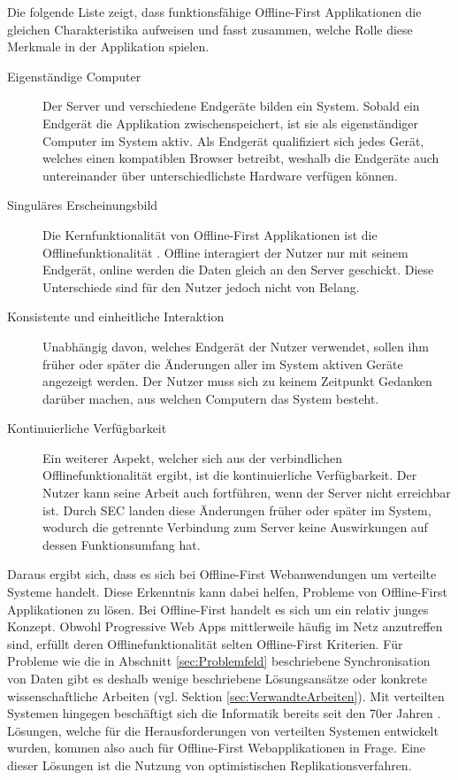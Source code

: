 \documentclass[a4paper, 12pt]{scrreprt}
\begin{document}
Die folgende Liste zeigt, dass funktionsfähige Offline-First Applikationen die gleichen Charakteristika aufweisen und fasst zusammen, welche Rolle diese Merkmale in der Applikation spielen.

\begin{description}		
\item[Eigenständige Computer] Der Server und verschiedene Endgeräte bilden ein System. Sobald ein Endgerät die Applikation zwischenspeichert, ist sie als eigenständiger Computer im System aktiv. Als Endgerät qualifiziert sich jedes Gerät, welches einen kompatiblen Browser betreibt, weshalb die Endgeräte auch untereinander über unterschiedlichste Hardware verfügen können.
\item[Singuläres Erscheinungsbild]Die Kernfunktionalität von Offline-First Applikationen ist die Offlinefunktionalität \autocite{OnlineGoogleOfflineFirst}. Offline interagiert der Nutzer nur mit seinem Endgerät, online werden die Daten gleich an den Server geschickt. Diese Unterschiede sind für den Nutzer jedoch nicht von Belang. \item[Konsistente und einheitliche Interaktion]
Unabhängig davon, welches Endgerät der Nutzer verwendet, sollen ihm früher oder später die Änderungen aller im System aktiven Geräte angezeigt werden. Der Nutzer muss sich zu keinem Zeitpunkt Gedanken darüber machen, aus welchen Computern das System besteht.
\item[Kontinuierliche Verfügbarkeit]
Ein weiterer Aspekt, welcher sich aus der verbindlichen Offlinefunktionalität ergibt, ist die kontinuierliche Verfügbarkeit. Der Nutzer kann seine Arbeit auch fortführen, wenn der Server nicht erreichbar ist. Durch SEC landen diese Änderungen früher oder später im System, wodurch die getrennte Verbindung zum Server keine Auswirkungen auf dessen Funktionsumfang hat. 
\end{description}
\label{tab:charakteristikaOfflineFirst}

Daraus ergibt sich, dass es sich bei Offline-First Webanwendungen um verteilte Systeme handelt. Diese Erkenntnis kann dabei helfen, Probleme von Offline-First Applikationen zu lösen. Bei Offline-First handelt es sich um ein relativ junges Konzept. Obwohl Progressive Web Apps mittlerweile häufig im Netz anzutreffen sind, erfüllt deren Offlinefunktionalität selten Offline-First Kriterien. Für Probleme wie die in Abschnitt \ref{sec:Problemfeld} beschriebene Synchronisation von Daten gibt es deshalb wenige beschriebene Lösungsansätze oder konkrete wissenschaftliche Arbeiten (vgl. Sektion \ref{sec:VerwandteArbeiten}). Mit verteilten Systemen hingegen beschäftigt sich die Informatik bereits seit den 70er Jahren \autocite{Andrews1999FoundationsOM}. Lösungen, welche für die Herausforderungen von verteilten Systemen entwickelt wurden, kommen also auch für Offline-First Webapplikationen in Frage. Eine dieser Lösungen ist die Nutzung von optimistischen Replikationsverfahren. 
\end{document}

